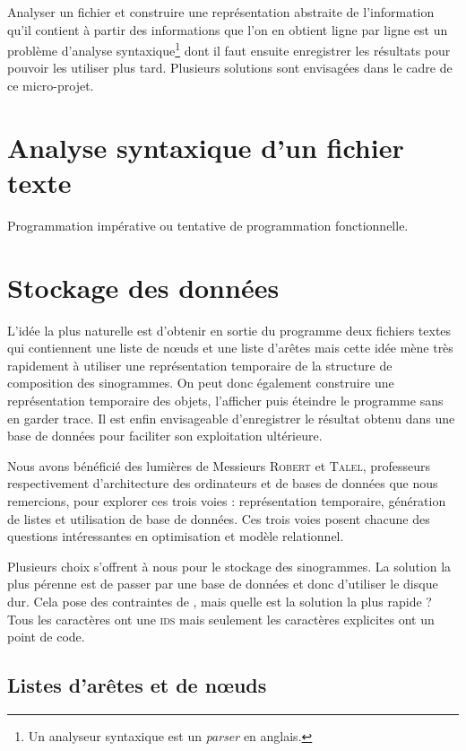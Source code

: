 Analyser un fichier et construire une représentation abstraite de l'information qu'il contient à partir des informations que l'on en obtient ligne par ligne est un problème d'analyse syntaxique\footnote{Un analyseur syntaxique est un \textsl{parser} en anglais.} dont il faut ensuite enregistrer les résultats pour pouvoir les utiliser plus tard. Plusieurs solutions sont envisagées dans le cadre de ce micro-projet. 

\section{Analyse syntaxique d'un fichier texte}

Programmation impérative ou tentative de programmation fonctionnelle.

\section{Stockage des données}

L'idée la plus naturelle est d'obtenir en sortie du programme deux fichiers textes qui contiennent une liste de nœuds et une liste d'arêtes mais cette idée mène très rapidement à utiliser une représentation temporaire de la structure de composition des sinogrammes. On peut donc également construire une représentation temporaire des objets, l'afficher puis éteindre le programme sans en garder trace. Il est enfin envisageable d'enregistrer le résultat obtenu dans une base de données pour faciliter son exploitation ultérieure.

Nous avons bénéficié des lumières de Messieurs \textsc{Robert} et \textsc{Talel}, professeurs respectivement d'architecture des ordinateurs et de bases de données que nous remercions, pour explorer ces trois voies : représentation temporaire, génération de listes et utilisation de base de données. Ces trois voies posent chacune des questions intéressantes en optimisation et modèle relationnel.

Plusieurs choix s'offrent à nous pour le stockage des sinogrammes. La solution la plus pérenne est de passer par une base de données et donc d'utiliser le disque dur. Cela pose des contraintes de , mais quelle est la solution la plus rapide ? 
Tous les caractères ont une \textsc{ids} mais seulement les caractères explicites ont un point de code.

\subsection{Listes d'arêtes et de nœuds}

